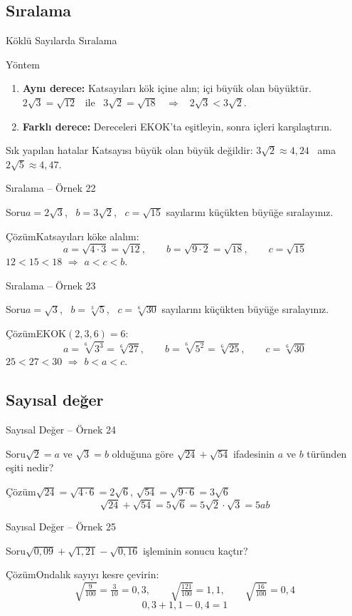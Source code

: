 \documentclass[aspectratio=169,11pt]{beamer}
\newcommand{\soru}[3]{%
\begin{frame}{#1}
  \begin{block}{Soru}\large #2\end{block}
  \pause
  \begin{exampleblock}{Çözüm}\large #3\end{exampleblock}
\end{frame}}
\begin{document}
\subsection{Sıralama}
\begin{frame}{Köklü Sayılarda Sıralama}
\begin{block}{Yöntem}
\begin{enumerate}
\item \textbf{Aynı derece:} Katsayıları kök içine alın; içi büyük olan büyüktür.\\
\(2\sqrt3=\sqrt{12}\) \ ile \ \(3\sqrt2=\sqrt{18}\) \ \(\Rightarrow\) \ \(2\sqrt3<3\sqrt2\).
\item \textbf{Farklı derece:} Dereceleri EKOK'ta eşitleyin, sonra içleri karşılaştırın.
\end{enumerate}
\end{block}
\begin{alertblock}{Sık yapılan hatalar}
Katsayısı büyük olan büyük değildir: \(3\sqrt2\approx 4{,}24\) \ ama \ \(2\sqrt5\approx 4{,}47\).
\end{alertblock}
\end{frame}

\soru{Sıralama -- Örnek 22}
{\(a=2\sqrt3\), \ \(b=3\sqrt2\), \ \(c=\sqrt{15}\) sayılarını küçükten büyüğe sıralayınız.}
{Katsayıları köke alalım:
\[a=\sqrt{4\cdot 3}=\sqrt{12},\qquad b=\sqrt{9\cdot 2}=\sqrt{18},\qquad c=\sqrt{15}\]
\(12<15<18\) \(\Rightarrow\) \(a<c<b\).}

\soru{Sıralama -- Örnek 23}
{\(a=\sqrt3\), \ \(b=\sqrt[3]{5}\), \ \(c=\sqrt[6]{30}\) sayılarını küçükten büyüğe sıralayınız.}
{EKOK\((2,3,6)=6\):
\[a=\sqrt[6]{3^3}=\sqrt[6]{27},\qquad b=\sqrt[6]{5^2}=\sqrt[6]{25},\qquad c=\sqrt[6]{30}\]
\(25<27<30\) \(\Rightarrow\) \(b<a<c\).}

\subsection{Sayısal değer}
\soru{Sayısal Değer -- Örnek 24}
{\(\sqrt2=a\) ve \(\sqrt3=b\) olduğuna göre \(\sqrt{24}+\sqrt{54}\) ifadesinin \(a\) ve \(b\) türünden eşiti nedir?}
{\(\sqrt{24}=\sqrt{4\cdot 6}=2\sqrt6\), \quad \(\sqrt{54}=\sqrt{9\cdot 6}=3\sqrt6\)
\[\sqrt{24}+\sqrt{54}=5\sqrt6=5\sqrt2\cdot\sqrt3=5ab\]}

\soru{Sayısal Değer -- Örnek 25}
{\(\sqrt{0{,}09}+\sqrt{1{,}21}-\sqrt{0{,}16}\) işleminin sonucu kaçtır?}
{Ondalık sayıyı kesre çevirin:
\[\sqrt{\tfrac{9}{100}}=\tfrac{3}{10}=0{,}3,\qquad \sqrt{\tfrac{121}{100}}=1{,}1,\qquad \sqrt{\tfrac{16}{100}}=0{,}4\]
\[0{,}3+1{,}1-0{,}4=1\]}
\end{document}
